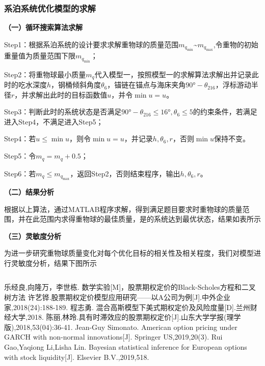 \documentclass{article}
\numberwithin{equation}{subsection}
\begin{document}
\subsubsection{系泊系统优化模型的求解}
\begin{flushleft}
\textbf{（一）循环搜索算法求解}
\end{flushleft}

Step1：根据系泊系统的设计要求求解重物球的质量范围$m_{q_{\min}}$\textasciitilde $m_{q_{\max}}$,令重物的初始重量值为质量范围下限$m_{q_{\min}}$；

Step2：将重物球最小质量$m_{q}$代入模型一，按照模型一的求解算法求解出并记录此时的吃水深度$h$，钢桶倾斜角度$\theta_{6}$，锚链在锚点与海床夹角$90°-\theta_{216}$，浮标游动半径$r$，并求解出此时的目标函数值$u$，并令$\min u=u$。

Step3：判断此时的系统状态是否满足$90°-\theta_{216}\le16°,\theta_{6}\le5$的约束条件，若满足进入Step4，不满足进入Step5；

Step4：若$u\le\min u$，则令$\min u=u$，并记录$h,\theta_{6},r$，否则$\min u$保持不变。

Step5：令$m_{q}=m_{q}+0.5$；

Step6：若$m_{q}\le m_{q_{\max}}$，返回Step2，否则结束程序，输出$h,\theta_{6},r$。

\begin{flushleft}
\textbf{（二）结果分析}
\end{flushleft}

根据以上算法，通过MATLAB程序求解，得到满足题目要求时重物球的质量范围，并在此范围内求得重物球的最佳质量，是的系统达到最优状态，结果如表所示

\begin{flushleft}
\textbf{（三）灵敏度分析}
\end{flushleft}

为进一步研究重物球质量变化对每个优化目标的相关性及相关程度，我们对模型进行灵敏度分析，结果下图所示
\begin{lstlisting}

\end{lstlisting}



\newpage
\begin{thebibliography}{99}
	乐经良,向隆万，李世栋. 数学实验[M]，股票期权定价的Black-Scholes方程和二叉树方法
	许艺铧.股票期权定价模型应用研究——以A公司为例[J].中外企业家,2018(24):188-189.
    程志勇. 混合高斯模型下美式期权定价及风险度量[D].兰州财经大学,2018.
    陈丽,林玲.具有时滞效应的股票期权定价[J].山东大学学报(理学版),2018,53(04):36-41.
    Jean-Guy Simonato. American option pricing under GARCH with non-normal innovations[J]. Springer US,2019,20(3).
    Rui Gao,Yaqiong Li,Lisha Lin. Bayesian statistical inference for European options with stock liquidity[J]. Elsevier B.V.,2019,518.
\end{thebibliography}
\end{document}
